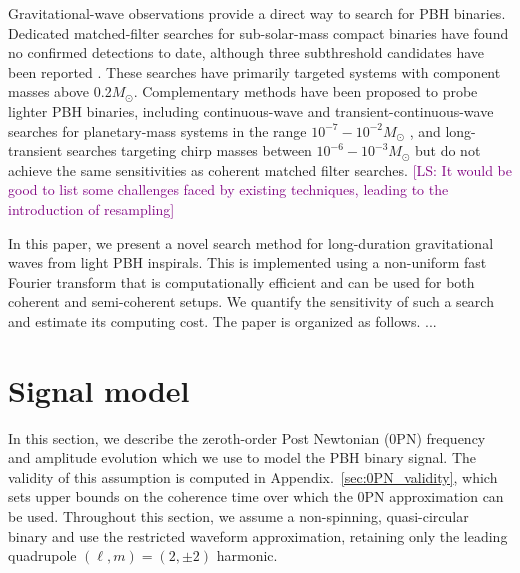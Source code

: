 \documentclass[aps,prd,amsmath,floats,floatfix, twocolumn,
superscriptaddress,nofootinbib,showpacs]{revtex4-2}
\newcommand{\ls}[1]{\textcolor{purple}{[LS: #1]}}
\begin{document}
Gravitational-wave observations provide a direct way to search for PBH binaries. Dedicated matched-filter searches for sub-solar-mass compact binaries have found no confirmed detections to date, although three subthreshold candidates have been reported \cite{LIGOScientific:2018glc, LIGOScientific:2019kan, LIGOScientific:2021job, LVK:2022ydq, Phukon:2021cus, Morras:2023jvb, Prunier:2023uoo}. These searches have primarily targeted systems with component masses above 0.2$M_\odot$. Complementary methods have been proposed to probe lighter PBH binaries, including continuous-wave and transient-continuous-wave searches for planetary-mass systems in the range $10^{-7} - 10^{-2}M_\odot$ \cite{Miller:2021knj}, and long-transient searches targeting chirp masses between $10^{-6} - 10^{-3}M_\odot$ \cite{Andres-Carcasona:2024jvz} but do not achieve the same sensitivities as coherent matched filter searches. \ls{It would be good to list some challenges faced by existing techniques, leading to the introduction of resampling}

In this paper, we present a novel search method for long-duration gravitational waves from light PBH inspirals. This is implemented using a non-uniform fast Fourier transform that is computationally efficient and can be used for both coherent and semi-coherent setups. We quantify the sensitivity of such a search and estimate its computing cost. The paper is organized as follows. ...


\section{Signal model}
\label{sec:GWs_from_PBHs}
In this section, we describe the zeroth-order Post Newtonian (0PN) frequency and amplitude evolution which we use to model the PBH binary signal. The validity of this assumption is computed in Appendix.~\ref{sec:0PN_validity}, which sets upper bounds on the coherence time over which the 0PN approximation can be used. Throughout this section, we assume a non-spinning, quasi-circular binary and use the restricted waveform approximation, retaining only the leading quadrupole $(\ell,m)=(2,\pm2)$ harmonic. 
\end{document}
